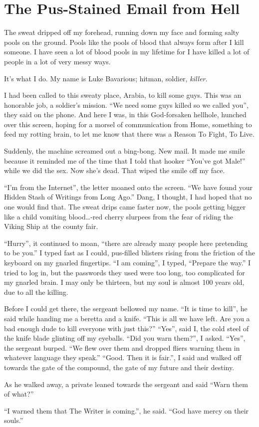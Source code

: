 \chapter{The Pus-Stained Email from Hell}


The sweat dripped off my forehead, running down my face and forming
salty pools on the ground. Pools like the pools of blood that
always form after I kill someone. I have seen a lot of blood pools
in my lifetime for I have killed a lot of people in a lot of very
messy ways.



It's what I do. My name is Luke Bavarious; hitman, soldier,
{\em killer}.



I had been called to this sweaty place, Arabia, to kill some guys.
This was an honorable job, a soldier's mission. ``We need some guys
killed so we called you'', they said on the phone. And here I was,
in this God-forsaken hellhole, hunched over this screen, hoping for
a morsel of communication from Home, something to feed my rotting
brain, to let me know that there was a Reason To Fight, To
Live.



Suddenly, the machine screamed out a bing-bong. New mail. It made
me smile because it reminded me of the time that I told that hooker
``You've got Male!'' while we did the sex. Now she's dead. That wiped
the smile off my face.



``I'm from the Internet'', the letter moaned onto the screen. ``We
have found your Hidden Stash of Writings from Long Ago.'' Dang, I
thought, I had hoped that no one would find that. The sweat drips
came faster now, the pools getting bigger like a child vomiting
blood{\ldots}-red cherry slurpees from the fear of riding the Viking
Ship at the county fair.



``Hurry'', it continued to moan, ``there are already many people here
pretending to be you.'' I typed fast as I could, pus-filled blisters
rising from the friction of the keyboard on my gnarled fingertips.
``I am coming'', I typed, ``Prepare the way.'' I tried to log in, but
the passwords they used were too long, too complicated for my
gnarled brain. I may only be thirteen, but my soul is almost 100
years old, due to all the killing.



Before I could get there, the sergeant bellowed my name. ``It is
time to kill'', he said while handing me a beretta and a knife.
``This is all we have left. Are you a bad enough dude to kill
everyone with just this?'' ``Yes'', said I, the cold steel of the
knife blade glinting off my eyeballs. ``Did you warn them?'', I
asked. ``Yes'', the sergeant burped. ``We flew over them and dropped
fliers warning them in whatever language they speak.'' ``Good. Then
it is fair.'', I said and walked off towards the gate of the
compound, the gate of my future and their destiny.



As he walked away, a private leaned towards the sergeant and said
``Warn them of what?''



``I warned them that The Writer is coming.'', he said. ``God have
mercy on their souls.'' 
 




